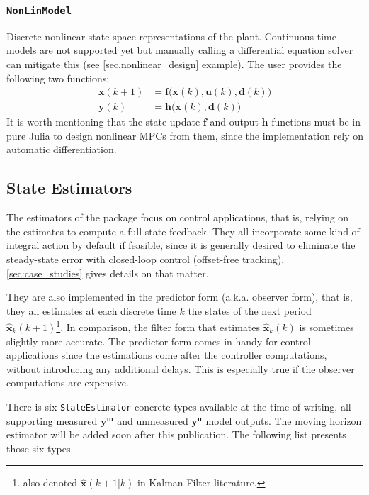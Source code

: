 \subsubsection{\textnormal{\texttt{NonLinModel}}}

Discrete nonlinear state-space representations of the plant. Continuous-time models are not supported yet but manually calling a differential equation solver can mitigate this (see \cref{sec.nonlinear_design} example). The user provides the following two functions:
\begin{subequations}
\begin{align}
    \mathbf{x}(k+1) &= \mathbf{f}\big(\mathbf{x}(k), \mathbf{u}(k), \mathbf{d}(k)\big) \\
    \mathbf{y}(k)   &= \mathbf{h}\big( \mathbf{x}(k), \mathbf{d}(k) \big)
\end{align}
\end{subequations}
It is worth mentioning that the state update $\mathbf{f}$ and output $\mathbf{h}$ functions must be in pure Julia to design nonlinear MPCs from them, since the implementation rely on automatic differentiation.

\subsection{State Estimators}

The estimators of the package focus on control applications, that is, relying on the estimates to compute a full state feedback. They all incorporate some kind of integral action by default if feasible, since it is generally desired to eliminate the steady-state error with closed-loop control (offset-free tracking). \cref{sec:case_studies} gives details on that matter.

They are also implemented in the predictor form (a.k.a. observer form), that is, they all estimates at each discrete time $k$ the states of the next period $\mathbf{\hat{x}}_k(k+1)$\footnote{also denoted $\mathbf{\hat{x}}(k+1|k)$ in Kalman Filter literature.}. In comparison, the filter form that estimates $\mathbf{\hat{x}}_k(k)$ is sometimes slightly more accurate. The predictor form comes in handy for control applications since the estimations come after the controller computations, without introducing any additional delays. This is especially true if the observer computations are expensive.

There is six \texttt{StateEstimator} concrete types available at the time of writing, all supporting measured $\mathbf{y^m}$ and unmeasured $\mathbf{y^u}$ model outputs. The moving horizon estimator will be added soon after this publication. The following list presents those six types.

